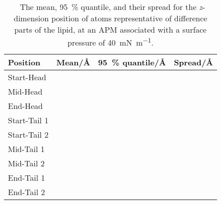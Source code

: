 %
%
\begin{table}
\centering
\small
  \caption{\ The mean, \SI{95}{\percent} quantile, and their spread for the \emph{z}-dimension position of atoms representative of difference parts of the lipid, at an APM associated with a surface pressure of \SI{40}{\milli\newton\per\meter}.}
  \label{tab:spread}
  \begin{tabular}{llll}
    \hline
    Position & Mean/\si{\angstrom} & \SI{95}{\percent} quantile/\si{\angstrom} & Spread/\si{\angstrom} \\
    \hline
    Start-Head &  &  &  \\
    Mid-Head &  &  &  \\
    End-Head &  &  &  \\
    \hline
    Start-Tail 1 &  &  &  \\
    Start-Tail 2 &  &  &  \\
    Mid-Tail 1 &  &  &  \\
    Mid-Tail 2 &  &  &  \\
    End-Tail 1 &  &  &  \\
    End-Tail 2 &  &  &  \\
    \hline
  \end{tabular}
\end{table}
